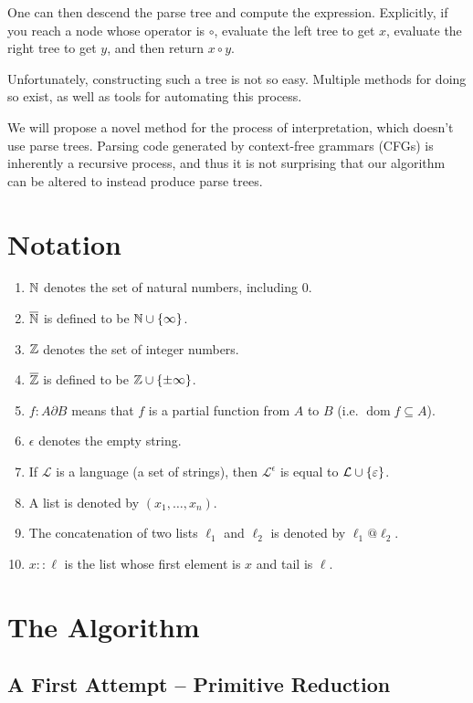 \documentclass{llncs}
\newcounter{algo}
\begin{document}
One can then descend the parse tree and compute the expression.
Explicitly, if you reach a node whose operator is $\circ$, evaluate the left tree to get $x$, evaluate the right tree to get $y$, and then return $x\circ y$.

Unfortunately, constructing such a tree is not so easy.
Multiple methods for doing so exist, as well as tools for automating this process.

We will propose a novel method for the process of interpretation, which doesn't use parse trees.
Parsing code generated by context-free grammars (CFGs) is inherently a recursive process, and thus it is not surprising that our algorithm can be altered to instead produce parse trees.

\section{Notation}

\begin{enumerate}
    \item $\mathbb N$ denotes the set of natural numbers, including $0$.
    \item $\overline{\mathbb N}$ is defined to be $\bN\cup\set\infty$.
    \item $\mathbb Z$ denotes the set of integer numbers.
    \item $\overline{\mathbb Z}$ is defined to be $\bZ\cup\set{\pm\infty}$.
    \item $f\colon A\partial B$ means that $f$ is a partial function from $A$ to $B$ (i.e. $\operatorname{dom}f\subseteq A$).
    \item $\epsilon$ denotes the empty string.
    \item If $\mathcal L$ is a language (a set of strings), then $\mathcal L^\epsilon$ is equal to $\mathcal L\cup\set\epsilon$.
    \item A list is denoted by $(x_1,\dots,x_n)$.
    \item The concatenation of two lists $\ell_1$ and $\ell_2$ is denoted by $\ell_1@\ell_2$.
    \item $x::\ell$ is the list whose first element is $x$ and tail is $\ell$.
\end{enumerate}

\section{The Algorithm}

\subsection{A First Attempt -- Primitive Reduction}
\end{document}
